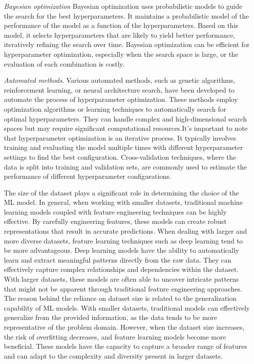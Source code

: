 \documentclass[9pt,bestpractices]{livecoms}
\begin{document}
\textit{Bayesian optimization} Bayesian optimization uses probabilistic models
to guide the search for the best hyperparameters. It maintains a probabilistic
model of the performance of the model as a function of the hyperparameters.
Based on this model, it selects hyperparameters that are likely to yield better
performance, iteratively refining the search over time. Bayesian optimization
can be efficient for hyperparameter optimization, especially when the search
space is large, or the evaluation of each combination is costly.

\textit{Automated methods}. Various automated methods, such as genetic
algorithms, reinforcement learning, or neural architecture search, have been
developed to automate the process of hyperparameter optimization. These methods
employ optimization algorithms or learning techniques to automatically search
for optimal hyperparameters. They can handle complex and high-dimensional search
spaces but may require significant computational resources.It's important to note that hyperparameter optimization is an iterative process.
It typically involves training and evaluating the model multiple times with
different hyperparameter settings to find the best configuration.
Cross-validation techniques, where the data is split into training and
validation sets, are commonly used to estimate the performance of different
hyperparameter configurations.

The size of the dataset plays a significant role in determining the choice of
the ML model. In general, when working with smaller datasets, traditional
machine learning models coupled with feature engineering techniques can be
highly effective. By carefully engineering features, these models can create
robust representations that result in accurate predictions.  When dealing with
larger and more diverse datasets, feature learning techniques such as deep
learning tend to be more advantageous. Deep learning models have the ability to
automatically learn and extract meaningful patterns directly from the raw data.
They can effectively capture complex relationships and dependencies within the
dataset. With larger datasets, these models are often able to uncover intricate
patterns that might not be apparent through traditional feature engineering
approaches.  The reason behind the reliance on dataset size is related to the
generalization capability of ML models. With smaller datasets, traditional
models can effectively generalize from the provided information, as the data
tends to be more representative of the problem domain. However, when the dataset
size increases, the risk of overfitting decreases, and feature learning models
become more beneficial. These models have the capacity to capture a broader
range of features and can adapt to the complexity and diversity present in
larger datasets.
\end{document}
